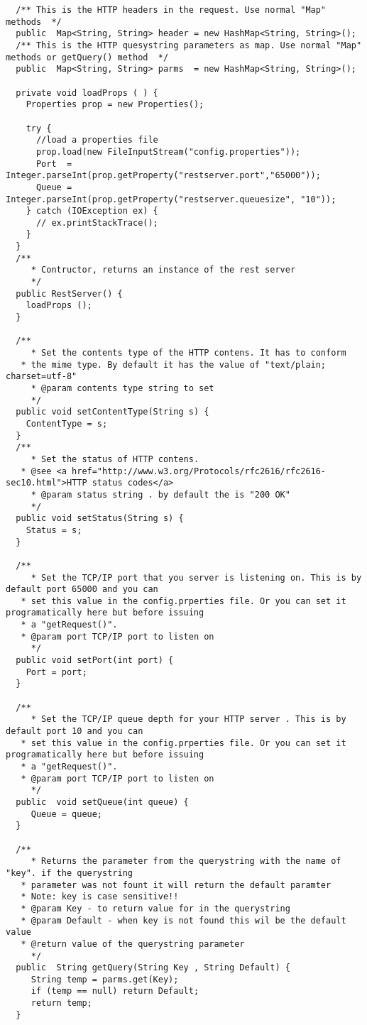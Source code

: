 \begin{lstlisting}
  /** This is the HTTP headers in the request. Use normal "Map" methods  */
  public  Map<String, String> header = new HashMap<String, String>();
  /** This is the HTTP quesystring parameters as map. Use normal "Map" methods or getQuery() method  */
  public  Map<String, String> parms  = new HashMap<String, String>();

  private void loadProps ( ) {
    Properties prop = new Properties();

    try {
      //load a properties file
      prop.load(new FileInputStream("config.properties"));
      Port  = Integer.parseInt(prop.getProperty("restserver.port","65000"));
      Queue = Integer.parseInt(prop.getProperty("restserver.queuesize", "10"));
    } catch (IOException ex) {
      // ex.printStackTrace();
    }
  }
  /**
	 * Contructor, returns an instance of the rest server
	 */
  public RestServer() {
    loadProps ();
  }

  /**
	 * Set the contents type of the HTTP contens. It has to conform
   * the mime type. By default it has the value of "text/plain; charset=utf-8"
	 * @param contents type string to set
	 */
  public void setContentType(String s) {
    ContentType = s;
  }
  /**
	 * Set the status of HTTP contens.
   * @see <a href="http://www.w3.org/Protocols/rfc2616/rfc2616-sec10.html">HTTP status codes</a>
	 * @param status string . by default the is "200 OK"
	 */
  public void setStatus(String s) {
    Status = s;
  }

  /**
	 * Set the TCP/IP port that you server is listening on. This is by default port 65000 and you can
   * set this value in the config.prperties file. Or you can set it programatically here but before issuing
   * a "getRequest()".
   * @param port TCP/IP port to listen on
	 */
  public void setPort(int port) {
    Port = port;
  }

  /**
	 * Set the TCP/IP queue depth for your HTTP server . This is by default port 10 and you can
   * set this value in the config.prperties file. Or you can set it programatically here but before issuing
   * a "getRequest()".
   * @param port TCP/IP port to listen on
	 */
  public  void setQueue(int queue) {
     Queue = queue;
  }

  /**
	 * Returns the parameter from the querystring with the name of "key". if the querystring
   * parameter was not fount it will return the default paramter
   * Note: key is case sensitive!!
   * @param Key - to return value for in the querystring
   * @param Default - when key is not found this wil be the default value
   * @return value of the querystring parameter
	 */
  public  String getQuery(String Key , String Default) {
     String temp = parms.get(Key);
     if (temp == null) return Default;
     return temp;
  }


\end{lstlisting}

